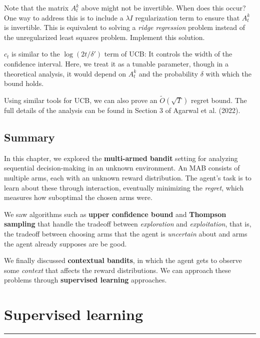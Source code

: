 \documentclass[
  letterpaper,
  DIV=11,
  numbers=noendperiod]{scrreprt}
\theoremstyle{plain}
\theoremstyle{plain}
\theoremstyle{definition}
\theoremstyle{definition}
\theoremstyle{remark}
\begin{document}
Note that the matrix \(A_t^k\) above might not be invertible. When does
this occur? One way to address this is to include a \(\lambda I\)
regularization term to ensure that \(A_t^k\) is invertible. This is
equivalent to solving a \emph{ridge regression} problem instead of the
unregularized least squares problem. Implement this solution.

\(c_t\) is similar to the \(\log (2t/\delta')\) term of UCB: It controls
the width of the confidence interval. Here, we treat it as a tunable
parameter, though in a theoretical analysis, it would depend on
\(A_t^k\) and the probability \(\delta\) with which the bound holds.

Using similar tools for UCB, we can also prove an
\(\tilde{O}(\sqrt{T})\) regret bound. The full details of the analysis
can be found in Section 3 of Agarwal et al. (2022).

\section{Summary}\label{summary-2}

In this chapter, we explored the \textbf{multi-armed bandit} setting for
analyzing sequential decision-making in an unknown environment. An MAB
consists of multiple arms, each with an unknown reward distribution. The
agent's task is to learn about these through interaction, eventually
minimizing the \emph{regret}, which measures how suboptimal the chosen
arms were.

We saw algorithms such as \textbf{upper confidence bound} and
\textbf{Thompson sampling} that handle the tradeoff between
\emph{exploration} and \emph{exploitation}, that is, the tradeoff
between choosing arms that the agent is \emph{uncertain} about and arms
the agent already supposes are be good.

We finally discussed \textbf{contextual bandits}, in which the agent
gets to observe some \emph{context} that affects the reward
distributions. We can approach these problems through \textbf{supervised
learning} approaches.


\chapter{Supervised learning}\label{sec-sl}

\begin{center}\rule{0.5\linewidth}{0.5pt}\end{center}
\end{document}
